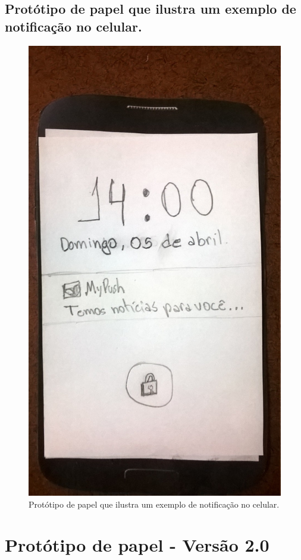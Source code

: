 \begin{anexosenv}
    \pagebreak
    \section*{Protótipo de papel que ilustra um exemplo de notificação no celular.}
    
      \begin{figure}[!htbp]
	\centering
	\includegraphics[scale=0.32]{editaveis/figuras/prototipo_papel_v1/tela_bloqueio_notificacao}
	\caption{Protótipo de papel que ilustra um exemplo de notificação no celular.}
	\label{tela_bloqueio_notificacao_v1}
      \end{figure}
    
\chapter{Protótipo de papel - Versão 2.0}

\end{anexosenv}

